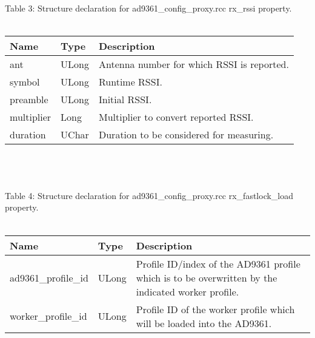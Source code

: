 \documentclass{article}
\def\comp{ad9361\_config\_proxy}
\begin{document}
\begin{landscape}
\\ \\ \\ \\ \\ \\ \\ \\
	Table \hypertarget{tab3}{3}: Structure declaration for \comp{}.rcc rx\_rssi property.\\ \\
		\begin{scriptsize}
		\begin{tabular}{|p{4.7cm}|p{2.7cm}|p{13.77cm}|} \hline  \cellcolor{blue} Name & \cellcolor{blue}Type & \cellcolor{blue}Description \\ \hline ant & ULong & Antenna number for which RSSI is reported. \\ \hline symbol & ULong & Runtime RSSI. \\ \hline preamble & ULong & Initial RSSI. \\ \hline multiplier & Long & Multiplier to convert reported RSSI. \\ \hline duration & UChar & Duration to be considered for measuring. \\ \hline\end{tabular}
	\end{scriptsize}\\ \\ \\
	Table \hypertarget{tab4}{4}: Structure declaration for \comp{}.rcc rx\_fastlock\_load property.\\ \\
		\begin{scriptsize}
		\begin{tabular}{|p{4.7cm}|p{2.7cm}|p{13.77cm}|} \hline \cellcolor{blue} Name & \cellcolor{blue}Type & \cellcolor{blue}Description \\ \hline ad9361\_profile\_id & ULong & Profile ID/index of the AD9361 profile which is to be overwritten by the indicated worker profile. \\ \hline worker\_profile\_id & ULong & Profile ID of the worker profile which will be loaded into the AD9361. \\ \hline \end{tabular}

\end{scriptsize}
\end{landscape}
\end{document}
